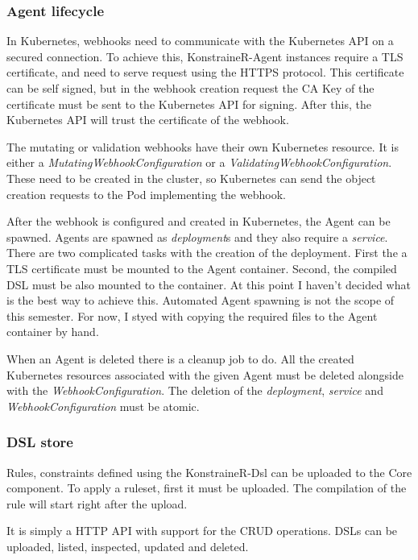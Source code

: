 \subsubsection{Agent lifecycle}

In Kubernetes, webhooks need to communicate with the Kubernetes API on a secured connection. To achieve this, KonstraineR-Agent instances require a TLS certificate, and need to serve request using the HTTPS protocol. This certificate can be self signed, but in the webhook creation request the CA Key of the certificate must be sent to the Kubernetes API for signing. After this, the Kubernetes API will trust the certificate of the webhook.

The mutating or validation webhooks have their own Kubernetes resource. It is either a \emph{MutatingWebhookConfiguration} or a \emph{ValidatingWebhookConfiguration}. These need to be created in the cluster, so Kubernetes can send the object creation requests to the Pod implementing the webhook.

After the webhook is configured and created in Kubernetes, the Agent can be spawned. Agents are spawned as \emph{deployment}s and they also require a \emph{service}. There are two complicated tasks with the creation of the deployment. First the a TLS certificate must be mounted to the Agent container. Second, the compiled DSL must be also mounted to the container. At this point I haven't decided what is the best way to achieve this. Automated Agent spawning is not the scope of this semester. For now, I styed with copying the required files to the Agent container by hand.

When an Agent is deleted there is a cleanup job to do. All the created Kubernetes resources associated with the given Agent must be deleted alongside with the \emph{WebhookConfiguration}. The deletion of the \emph{deployment}, \emph{service} and \emph{WebhookConfiguration} must be atomic.

\subsubsection{DSL store}

Rules, constraints defined using the KonstraineR-Dsl can be uploaded to the Core component. To apply a ruleset, first it must be uploaded. The compilation of the rule will start right after the upload.

It is simply a HTTP API with support for the CRUD operations. DSLs can be uploaded, listed, inspected, updated and deleted.

